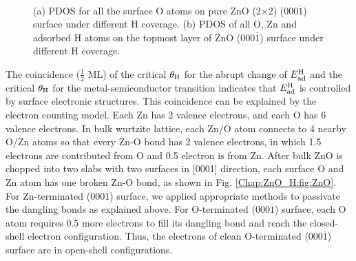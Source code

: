 \begingroup
\begin{figure}[!ht]
  \centering
  \label{Chap:ZnO_H:fig:DOSO} 
  \\
  \label{Chap:ZnO_H:fig:DOSall}
  \caption[\ac{PDOS} for all the surface O atoms on pure ZnO (2$\times$2) (000$\overline{1}$) surface under different H coverage]{(a) \ac{PDOS} for all the surface O atoms on pure ZnO (2$\times$2) (000$\overline{1}$) surface under different H coverage. (b) \ac{PDOS} of all O, Zn and adsorbed H atoms on the topmost layer of ZnO (000$\overline{1}$) surface under different H coverage.}
  \label{Chap:ZnO_H:fig:DOS}
\end{figure}
\endgroup

The coincidence ($\frac{1}{2}$ \ac{ML}) of the critical $\theta_{\textup{H}}$ for the abrupt change of $E_{\textup{ad}}^{\textup{H}}$ and the critical $\theta_{\textup{H}}$ for the metal-semiconductor transition indicates that $E_{\textup{ad}}^{\textup{H}}$ is controlled by surface electronic structures. This coincidence can be explained by the electron counting model\cite{pashley1989electron}. Each Zn has 2 valence electrons, and each O has 6 valence electrons. In bulk wurtzite lattice, each Zn/O atom connects to 4 nearby O/Zn atoms so that every Zn-O bond has 2 valence electrons, in which 1.5 electrons are contributed from O and 0.5 electron is from Zn. After bulk ZnO is chopped into two slabs with two surfaces in [0001] direction, each surface O and Zn atom has one broken Zn-O bond, as shown in Fig. \ref{Chap:ZnO_H:fig:ZnO}. For Zn-terminated (0001) surface, we applied appropriate methods to passivate the dangling bonds as explained above. For O-terminated (000$\overline{1}$) surface, each O atom requires 0.5 more electrons to fill its dangling bond and reach the closed-shell electron configuration. Thus, the electrons of clean O-terminated (000$\overline{1}$) surface are in open-shell configurations. 

